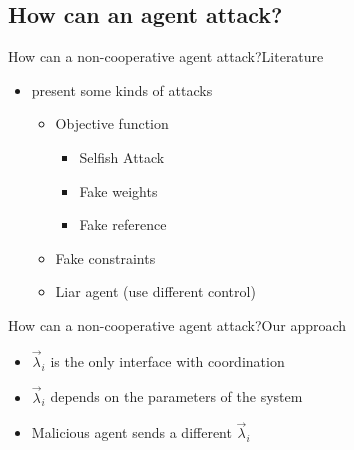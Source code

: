 \documentclass[aspectratio=169]{beamer}
\begin{document}
\subsection{How can an agent attack?}
\begin{frame}{How can a non-cooperative agent attack?}{Literature}

    \begin{itemize}
      \item<1-> \cite{VelardeEtAl2017a,ChanfreutEtAl2018} present some kinds of attacks
            \begin{itemize}
              \item<2-> Objective function
                    \begin{itemize}
                      \item<3-> Selfish Attack
                      \item<4-> Fake weights
                      \item<5-> Fake reference
                    \end{itemize}
              \item<6-> Fake constraints
              \item<7-> Liar agent (use different control)
            \end{itemize}
    \end{itemize}
\end{frame}

\begin{frame}{How can a non-cooperative agent attack?}{Our approach}
  \begin{overlayarea}{\textwidth}{.2\textwidth}
    \begin{minipage}[t]{.6\linewidth}
      \begin{itemize}
        \item<1-> $\vec{\lambda}_{i}$ is the only interface with coordination
        \item<2-> $\vec{\lambda}_{i}$ depends on the parameters of the system
        \item<4-> Malicious agent sends a different $\vec{\lambda}_{i}$
      \end{itemize}
      \centering
    \end{minipage}
    \hfill
    \begin{minipage}[t]{.3\linewidth}
      \begin{figure}
        \centering
      \end{figure}
    \end{minipage}
  \end{overlayarea}
\end{frame}
\end{document}
